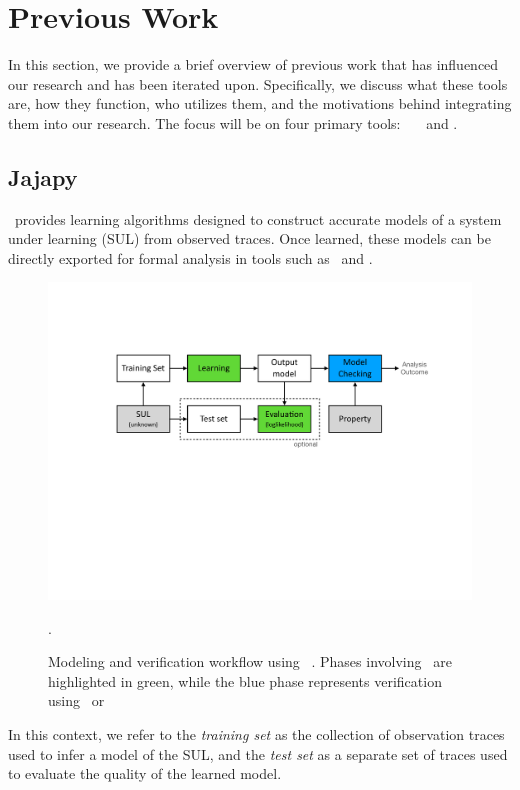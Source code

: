 \section{Previous Work}\label{sec:jajapy_and_cupaal}
In this section, we provide a brief overview of previous work that has influenced our research and has been iterated upon.
Specifically, we discuss what these tools are, how they function, who utilizes them, and the motivations behind integrating them into our research.
The focus will be on four primary tools: \Prism\, \Storm\, \Jajapy\ and \Cupaal.


\subsection{Jajapy}\label{sec:jajapy}
\Jajapy\ provides learning algorithms designed to construct accurate models of a system under learning (SUL) from observed traces.
Once learned, these models can be directly exported for formal analysis in tools such as \Storm~and \Prism.


\begin{figure}
    \centering
    \includegraphics[width=\columnwidth]{figures/workflow.pdf}
    \caption{Modeling and verification workflow using \Jajapy~\cite{jajapygithub}. Phases involving \Jajapy\ are highlighted in green, while the blue phase represents verification using \Storm\ or \Prism}.
    \label{fig:workflow}
\end{figure}


In this context, we refer to the \textit{training set} as the collection of observation traces used to infer a model of the SUL, and the \textit{test set} as a separate set of traces used to evaluate the quality of the learned model.

